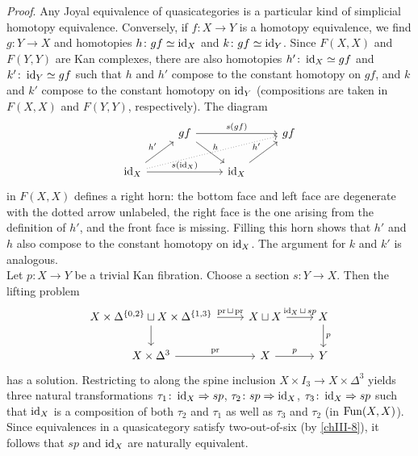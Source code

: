         \emph{Proof}. Any Joyal equivalence of quasicategories is a particular kind of simplicial homotopy equivalence. Conversely, if $f \colon X \to Y$ is a homotopy equivalence, we find $g \colon Y \to X$ and homotopies $h \colon gf \simeq \operatorname{id}_X$ and $k \colon gf \simeq \operatorname{id}_Y$. Since $F(X, X)$ and $F(Y, Y)$ are Kan complexes, there are also homotopies $h' \colon \operatorname{id}_X \simeq gf$ and $k' \colon \operatorname{id}_Y \simeq gf$ such that $h$ and $h'$ compose to the constant homotopy on $gf$, and $k$ and $k'$ compose to the constant homotopy on $\operatorname{id}_Y$ (compositions are taken in $F(X, X)$ and $F(Y, Y)$, respectively). The diagram
        \begin{equation*}
            \begin{tikzcd}
                & gf \arrow[dr, "h"] \arrow[rr, "{s(gf)}"] & & gf \\
                \id_X \arrow[ur, "h'"] \arrow[urrr, dotted] \arrow[rr, "{s(\id_X)}"] & & \id_X \arrow[ur, "h'"] &
            \end{tikzcd}
        \end{equation*}
        in $F(X, X)$ defines a right horn: the bottom face and left face are degenerate with the dotted arrow unlabeled, the right face is the one arising from the definition of $h'$, and the front face is missing. Filling this horn shows that $h'$ and $h$ also compose to the constant homotopy on $\operatorname{id}_X$. The argument for $k$ and $k'$ is analogous.\\
        Let $p \colon X \to Y$ be a trivial Kan fibration. Choose a section $s \colon Y \to X$. Then the lifting problem
        \begin{equation*}
            \begin{tikzcd}
                X \times \Delta^{\{0,2\}} \sqcup X \times \Delta^{\{1,3\}} \arrow[d] \arrow[r, "\pr \sqcup \pr"] & X \sqcup X \arrow[r, "\id_X \sqcup \, sp"] & X \arrow[d, "p"] \\
                X \times \Delta^3 \arrow[r, "\pr"] & X \arrow[r, "p"] & Y
            \end{tikzcd}
        \end{equation*}
        has a solution. Restricting to along the spine inclusion $X \times I_3 \to X \times \Delta^3$ yields three natural transformations $\tau_1 \colon \operatorname{id}_X \Rightarrow s p$, $\tau_2 \colon s p \Rightarrow \operatorname{id}_X$, $\tau_3 \colon \operatorname{id}_X \Rightarrow s p$ such that $\operatorname{id}_X$ is a composition of both $\tau_2$ and $\tau_1$ as well as $\tau_3$ and $\tau_2$ (in $\operatorname{Fun}(X, X)$). Since equivalences in a quasicategory satisfy two-out-of-six (by \ref{chIII-8}), it follows that $s p$ and $\operatorname{id}_X$ are naturally equivalent.\\
